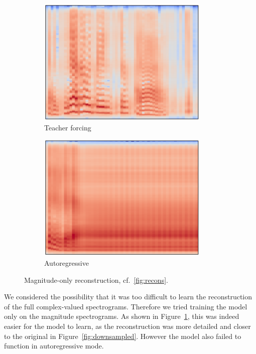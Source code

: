 \documentclass[11pt]{article}
\begin{document}
\begin{figure}
  \begin{subfigure}{0.5\textwidth}
    \centering
    \includegraphics[width=0.9\textwidth]{image/magn_forcing.pdf}
    \caption*{Teacher forcing}
  \end{subfigure}%
  \begin{subfigure}{0.5\textwidth}
    \centering
    \includegraphics[width=0.9\textwidth]{image/magn_autoreg.pdf}
    \caption*{Autoregressive}
  \end{subfigure}
  \caption{\label{fig:recons-magn}Magnitude-only reconstruction, cf.~\ref{fig:recons}.}
\end{figure}

We considered the possibility that it was too difficult to learn
the reconstruction of the full complex-valued spectrograms.
Therefore we tried training the model only on the magnitude spectrograms.
As shown in Figure~\ref{fig:recons-magn},
this was indeed easier for the model to learn,
as the reconstruction was more detailed and closer to the original in Figure~\ref{fig:downsampled}.
However the model also failed to function in autoregressive mode.
\end{document}
